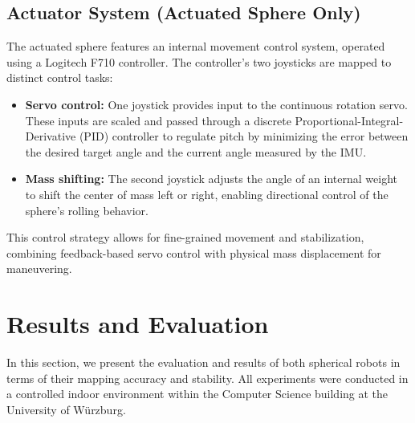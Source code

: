 \documentclass[a4paper, conference]{IEEEtran}
\begin{document}
\subsection{Actuator System (Actuated Sphere Only)}
The actuated sphere features an internal movement control system, operated using a Logitech F710 controller. 
The controller's two joysticks are mapped to distinct control tasks:
\begin{itemize}
    \item \textbf{Servo control:} One joystick provides input to the continuous rotation servo. 
    These inputs are scaled and passed through a discrete Proportional-Integral-Derivative (PID) controller to regulate pitch by minimizing the error between the desired target angle and the current angle measured by the IMU.
    \item \textbf{Mass shifting:} The second joystick adjusts the angle of an internal weight to shift the center of mass left or right, enabling directional control of the sphere's rolling behavior.
\end{itemize}
This control strategy allows for fine-grained movement and stabilization, combining feedback-based servo control with physical mass displacement for maneuvering.

\section{Results and Evaluation}
In this section, we present the evaluation and results of both spherical robots in terms of their mapping accuracy and stability.
All experiments were conducted in a controlled indoor environment within the Computer Science building at the University of Würzburg.
\end{document}
